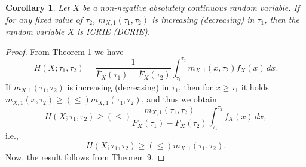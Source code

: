 \documentclass[11pt]{article}
\newtheorem{corollary}{Corollary}
\begin{document}
\begin{corollary}
	Let $X$ be a non-negative absolutely continuous random variable. If for any fixed value of $\tau_2$, $m_{X,1}(\tau_1,\tau_2)$ is increasing (decreasing) in $\tau_1$, then the random variable $X$ is ICRIE (DCRIE). 
\end{corollary} 

\begin{proof}
	From Theorem 1 we have
	$$ \textstyle H(X;\tau_1,\tau_2) = \frac{1}{\overline{F}_X(\tau_1) - \overline{F}_X(\tau_2)} \int_{\tau_1}^{\tau_2} m_{X,1}(x,\tau_2) f_X(x)\, dx. $$
	If $m_{X,1}(\tau_1,\tau_2)$ is increasing (decreasing) in $\tau_1$, then for $x \geq \tau_1$ it holds $m_{X,1}(x,\tau_2) \geq (\leq) m_{X,1}(\tau_1,\tau_2)$, and thus we obtain
	$$ \textstyle H(X;\tau_1,\tau_2) \geq (\leq) \frac{m_{X,1}(\tau_1,\tau_2)}{\overline{F}_X(\tau_1) - \overline{F}_X(\tau_2)} \int_{\tau_1}^{\tau_2} f_X(x)\, dx, $$
	i.e.,
	$$ \textstyle H(X;\tau_1,\tau_2) \geq (\leq) m_{X,1}(\tau_1,\tau_2). $$
	Now, the result follows from Theorem 9.
\end{proof}
\end{document}
